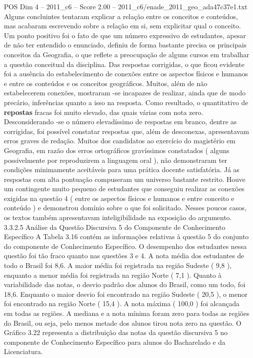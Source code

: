 \begin{textsample}{POS Dim 4 – 2011\_c6 – Score 2.00 – 2011\_c6/enade\_2011\_geo\_ada47c37e1.txt}
Alguns concluintes tentaram explicar a relação entre os conceitos e conteúdos, mas acabaram escrevendo sobre a relação em si, sem explicitar qual o conceito.
Um ponto positivo foi o fato de que um número expressivo de estudantes, apesar de não ter entendido o enunciado, definiu de forma bastante precisa os principais conceitos da Geografia, o que reflete a preocupação de alguns cursos em trabalhar a questão conceitual da disciplina.
Das respostas corrigidas, o que ficou evidente foi a ausência do estabelecimento de conexões entre os aspectos físicos e humanos e entre os conteúdos e os conceitos geográficos.
Muitos, além de não estabelecerem conexões, mostraram -se incapazes de realizar, ainda que de modo precário, inferências quanto a isso na resposta.
Como resultado, o quantitativo de \textbf{repostas} fracas foi muito elevado, das quais várias com nota zero.
Desconsiderando -se o número elevadíssimo de respostas em branco, dentre as corrigidas, foi possível constatar respostas que, além de desconexas, apresentavam erros graves de redação.
Muitos dos candidatos ao exercício do magistério em Geografia, em razão dos erros ortográficos gravíssimos constatados ( alguns possivelmente por reproduzirem a linguagem oral ), não demonstraram ter condições minimamente aceitáveis para uma prática docente satisfatória.
Já as respostas com alta pontuação compuseram um universo bastante restrito.
Houve um contingente muito pequeno de estudantes que conseguiu realizar as conexões exigidas na questão 4 ( entre os aspectos físicos e humanos e entre conceito e conteúdo ) e demonstrou domínio sobre o que foi solicitado.
Nesses poucos casos, os textos também apresentavam inteligibilidade na exposição do argumento. 3.3.2.5 Análise da Questão Discursiva 5 do Componente de Conhecimento Específico A Tabela 3.16 contém as informações relativas à questão 5 do conjunto do componente de Conhecimento Específico.
O desempenho dos estudantes nessa questão foi tão fraco quanto nas questões 3 e 4.
A nota média dos estudantes de todo o Brasil foi 8,6.
A maior média foi registrada na região Sudeste ( 9,8 ), enquanto a menor média foi registrada na região Norte ( 7,1 ).
Quanto à variabilidade das notas, o desvio padrão dos alunos do Brasil, como um todo, foi 18,6.
Enquanto o maior desvio foi encontrado na região Sudeste ( 20,5 ), o menor foi encontrado na região Norte ( 15,4 ).
A nota máxima ( 100,0 ) foi alcançada em todas as regiões.
A mediana e a nota mínima foram zero para todas as regiões do Brasil, ou seja, pelo menos metade dos alunos tirou nota zero na questão.
O Gráfico 3.22 representa a distribuição das notas da questão discursiva 5 no componente de Conhecimento Específico para alunos do Bacharelado e da Licenciatura.

\end{textsample}
